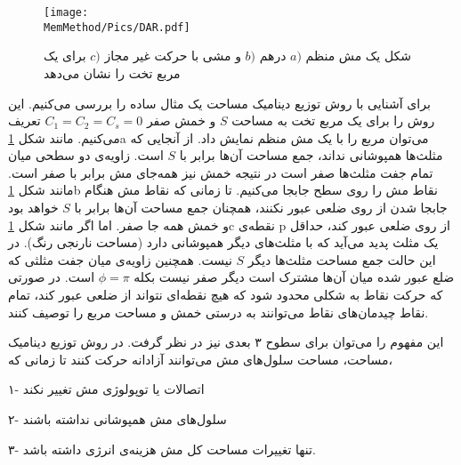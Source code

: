 \begin{figure}[h]
\begin{center}
\texttt{[image: \\MemMethod/Pics/DAR.pdf]}
\caption{
شکل یک مش منظم
$a)$
درهم
$b)$
و مشی با حرکت غیر مجاز 
$c)$
برای یک مربع تخت را نشان می‌دهد
}
\label{fig:DARs}
\end{center}
\end{figure}


برای آشنایی با روش توزیع دینامیک مساحت یک مثال ساده را بررسی می‌کنیم. این روش را برای یک مربع تخت به مساحت 
$S$
و خمش صفر
$C_1=C_2=C_s=0$
تعریف می‌کنیم. مانند شکل
\ref{fig:DARs}a
می‌توان مربع را با یک مش منظم نمایش داد. از آنجایی که مثلث‌ها همپوشانی نداند، جمع مساحت آن‌ها برابر با 
$S$
است. زاویه‌ی دو سطحی میان تمام جفت مثلث‌ها صفر است در نتیجه خمش نیز همه‌جای مش برابر با صفر است. مانند شکل
\ref{fig:DARs}b
نقاط مش را روی سطح جابجا می‌کنیم. تا زمانی که نقاط مش هنگام جابجا شدن از روی ضلعی عبور نکنند، همچنان جمع مساحت آن‌ها برابر با 
$S$
خواهد بود و خمش همه‌ جا صفر. اما اگر مانند شکل
\ref{fig:DARs}c
نقطه‌ی 
p
از روی ضلعی عبور کند، حداقل یک مثلث پدید می‌آید که با مثلث‌های دیگر همپوشانی دارد (مساحت نارنجی رنگ). در این حالت جمع مساحت مثلث‌ها دیگر
$S$
نیست. همچنین زاویه‌ی میان جفت مثلثی که ضلع عبور شده میان آن‌ها مشترک است دیگر صفر نیست بکله
$\phi=\pi$
است. در صورتی که حرکت نقاط به شکلی محدود شود که هیچ نقطه‌ای نتواند از ضلعی عبور کند، تمام نقاط چیدمان‌های نقاط می‌توانند به درستی خمش و مساحت مربع را توصیف کنند.

این مفهوم را می‌توان برای سطوح ۳ بعدی نیز در نظر گرفت. در روش توزیع دینامیک مساحت، مساحت سلول‌های مش می‌توانند آزادانه حرکت کنند تا زمانی که،

۱- اتصالات یا توپولوژی مش تغییر نکند

۲- سلول‌های مش همپوشانی نداشته باشند

۳- تنها تغییرات مساحت کل مش هزینه‌ی انرژی داشته باشد.





